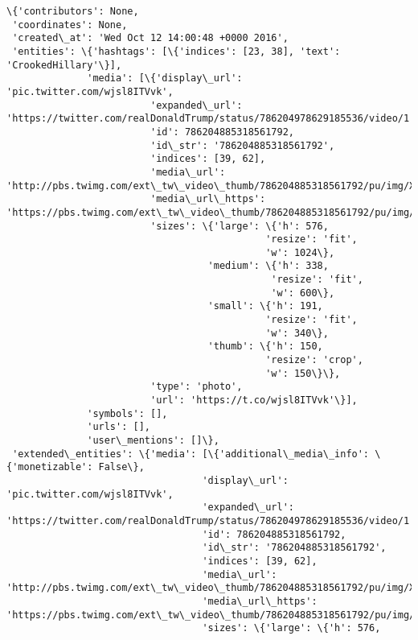 \documentclass[11pt]{article}
\begin{document}
    \begin{Verbatim}[commandchars=\\\{\}]
\{'contributors': None,
 'coordinates': None,
 'created\_at': 'Wed Oct 12 14:00:48 +0000 2016',
 'entities': \{'hashtags': [\{'indices': [23, 38], 'text': 'CrookedHillary'\}],
              'media': [\{'display\_url': 'pic.twitter.com/wjsl8ITVvk',
                         'expanded\_url': 'https://twitter.com/realDonaldTrump/status/786204978629185536/video/1',
                         'id': 786204885318561792,
                         'id\_str': '786204885318561792',
                         'indices': [39, 62],
                         'media\_url': 'http://pbs.twimg.com/ext\_tw\_video\_thumb/786204885318561792/pu/img/XqMoixLm83FzkAbn.jpg',
                         'media\_url\_https': 'https://pbs.twimg.com/ext\_tw\_video\_thumb/786204885318561792/pu/img/XqMoixLm83FzkAbn.jpg',
                         'sizes': \{'large': \{'h': 576,
                                             'resize': 'fit',
                                             'w': 1024\},
                                   'medium': \{'h': 338,
                                              'resize': 'fit',
                                              'w': 600\},
                                   'small': \{'h': 191,
                                             'resize': 'fit',
                                             'w': 340\},
                                   'thumb': \{'h': 150,
                                             'resize': 'crop',
                                             'w': 150\}\},
                         'type': 'photo',
                         'url': 'https://t.co/wjsl8ITVvk'\}],
              'symbols': [],
              'urls': [],
              'user\_mentions': []\},
 'extended\_entities': \{'media': [\{'additional\_media\_info': \{'monetizable': False\},
                                  'display\_url': 'pic.twitter.com/wjsl8ITVvk',
                                  'expanded\_url': 'https://twitter.com/realDonaldTrump/status/786204978629185536/video/1',
                                  'id': 786204885318561792,
                                  'id\_str': '786204885318561792',
                                  'indices': [39, 62],
                                  'media\_url': 'http://pbs.twimg.com/ext\_tw\_video\_thumb/786204885318561792/pu/img/XqMoixLm83FzkAbn.jpg',
                                  'media\_url\_https': 'https://pbs.twimg.com/ext\_tw\_video\_thumb/786204885318561792/pu/img/XqMoixLm83FzkAbn.jpg',
                                  'sizes': \{'large': \{'h': 576,

\end{Verbatim}
\end{document}
